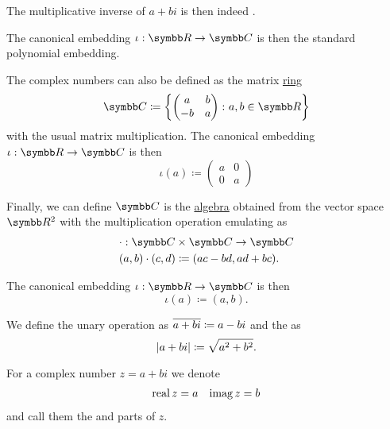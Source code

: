 \begin{definition}
\begin{DefEnum}
    The multiplicative inverse of \( a + bi \) is then indeed .

    The canonical embedding \( \iota: \BR \to \BC \) is then the standard polynomial embedding.

     The complex numbers can also be defined as the matrix \hyperref[def:algebra_of_matrices]{ring}
    \begin{equation*}
      \BC \coloneqq \left\{
      \begin{pmatrix}
        a  & b \\
        -b & a
      \end{pmatrix}
      \colon a, b \in \BR \right\}
    \end{equation*}
    with the usual matrix multiplication. The canonical embedding \( \iota: \BR \to \BC \) is then
    \begin{equation*}
      \iota(a) \coloneqq \begin{pmatrix}
        a & 0 \\
        0 & a
      \end{pmatrix}
    \end{equation*}

     Finally, we can define \( \BC \) is the \hyperref[def:algebra_over_ring]{algebra} obtained from the vector space \( \BR^2 \) with the multiplication operation emulating  as
    \begin{align*}
       & \cdot: \BC \times \BC \to \BC                     \\
       & (a, b) \cdot (c, d) \coloneqq (ac - bd, ad + bc).
    \end{align*}

    The canonical embedding \( \iota: \BR \to \BC \) is then
    \begin{equation*}
      \iota(a) \coloneqq (a, b).
    \end{equation*}
  \end{DefEnum}

  We define the unary  operation as \( \overline{a + bi} \coloneqq a - bi \) and the  as
  \begin{equation*}
    \left\vert a + bi \right\vert \coloneqq \sqrt{a^2 + b^2}.
  \end{equation*}

  For a complex number \( z = a + bi \) we denote
  \begin{align*}
    \operatorname{real} z = a &  & \operatorname{imag} z = b
  \end{align*}
  and call them the  and  parts of \( z \).
\end{definition}

